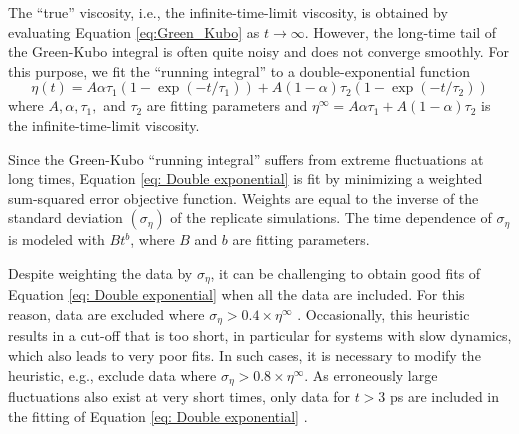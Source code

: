 \documentclass[preprint,review,12pt]{elsarticle}
\begin{document}
	
	The ``true'' viscosity, i.e., the infinite-time-limit viscosity, is obtained by evaluating Equation \ref{eq:Green_Kubo} as $t \rightarrow \infty$. However, the long-time tail of the Green-Kubo integral is often quite noisy and does not converge smoothly. For this purpose, we fit the ``running integral'' to a double-exponential function
	\begin{equation} \label{eq: Double exponential}
	\eta(t) = A \alpha \tau_1 \left(1-\exp{(-t/\tau_1)}\right) + A (1-\alpha) \tau_2 \left(1-\exp{(-t/\tau_2)}\right)
	\end{equation}
	where $A, \alpha, \tau_1, $ and $\tau_2$ are fitting parameters and $\eta^\infty = A \alpha \tau_1 + A (1-\alpha) \tau_2$ is the infinite-time-limit viscosity. 
	
	
	Since the Green-Kubo ``running integral'' suffers from extreme fluctuations at long times, Equation \ref{eq: Double exponential} is fit by minimizing a weighted sum-squared error objective function. Weights are equal to the inverse of the standard deviation $(\sigma_{\eta})$ of the replicate simulations. The time dependence of $\sigma_{\eta}$ is modeled with $B t^{b}$, where $B$ and $b$ are fitting parameters.
	
	Despite weighting the data by $\sigma_{\eta}$, it can be challenging to obtain good fits of Equation \ref{eq: Double exponential} when all the data are included. For this reason, data are excluded where $\sigma_{\eta} > 0.4 \times \eta^{\infty}$ \cite{Maginn2018,Zhang2015}. Occasionally, this heuristic results in a cut-off that is too short, in particular for systems with slow dynamics, which also leads to very poor fits. In such cases, it is necessary to modify the heuristic, e.g., exclude data where $\sigma_{\eta} > 0.8 \times \eta^{\infty}$. As erroneously large fluctuations also exist at very short times, only data for $t > 3$ ps are included in the fitting of Equation \ref{eq: Double exponential} \cite{Maginn2018,Zhang2015}. 
	 
\end{document}
